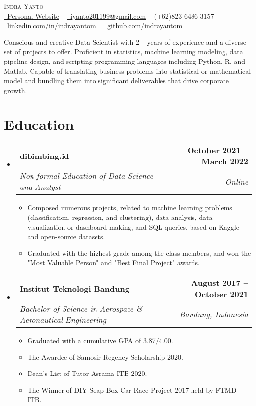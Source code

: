 \documentclass[letterpaper,11pt]{article}
\makeatletter
\newcommand{\resumeItem}[1]{
	\item\small{
		{#1 \vspace{-2pt}}
	}
}
\newcommand{\resumeSubheading}[4]{
	\vspace{-2pt}\item
	\begin{tabular*}{1.0\textwidth}[t]{l@{\extracolsep{\fill}}r}
		\textbf{#1} & \textbf{\small #2} \\
		\textit{\small#3} & \textit{\small #4} \\
	\end{tabular*}\vspace{-7pt}
}
\newcommand{\resumeSubHeadingListStart}{\begin{itemize}[leftmargin=0.0in, label={}]}
\newcommand{\resumeSubHeadingListEnd}{\end{itemize}}
\newcommand{\resumeItemListStart}{\begin{itemize}}
\newcommand{\resumeItemListEnd}{\end{itemize}\vspace{-5pt}}
\makeatother
\begin{document}
	
	
	\begin{center}
		{\Huge \scshape Indra Yanto} %
	\\ \vspace{2pt}
		\small \href{https://indrayantom.github.io/indrapedia/}{\raisebox{-0.2\height}\faGlobe\ Personal Website} ~ \href{mailto:iyanto201199@gmail.com}{\raisebox{-0.2\height}\faEnvelope\  iyanto201199@gmail.com} ~ \raisebox{-0.1\height}\faPhone (+62)823-6486-3157 \\
		\href{https://www.linkedin.com/in/indrayantom/}{\raisebox{-0.2\height}\faLinkedin\ linkedin.com/in/indrayantom}  ~
		\href{https://github.com/indrayantom}{\raisebox{-0.2\height}\faGithub\ github.com/indrayantom}
		\vspace{-8pt}
	\end{center} 
	\vspace{7pt}
	
	Conscious and creative Data Scientist with 2+ years of experience and a diverse set of projects to offer. Proficient in statistics, machine learning modeling, data pipeline design, and scripting programming languages including Python, R, and Matlab. Capable of translating business problems into statistical or mathematical model and bundling them into significant deliverables that drive corporate growth.	
	\section{Education}
	\resumeSubHeadingListStart
	\resumeSubheading
	{dibimbing.id}{October 2021 -- March 2022}
	{Non-formal Education of Data Science and Analyst}{Online}
		\resumeItemListStart
	\resumeItem{Composed numerous projects, related to machine learning problems (classification, regression, and clustering), data analysis, data visualization or dashboard making, and SQL queries, based on Kaggle and open-source datasets.}
	\resumeItem{Graduated with the highest grade among the class members, and won the "Most Valuable Person" and "Best Final Project" awards.}
	\resumeItemListEnd
	\resumeSubheading
	{Institut Teknologi Bandung}{August 2017 -- October 2021}
	{Bachelor of Science in Aerospace \& Aeronautical Engineering}{Bandung, Indonesia}
	\resumeItemListStart
	\resumeItem{Graduated with a cumulative GPA  of 3.87/4.00. }
	\resumeItem{The Awardee of Samosir Regency Scholarship 2020.}
	\resumeItem{Dean's List of Tutor Asrama ITB 2020.}
	\resumeItem{The Winner of DIY Soap-Box Car Race Project 2017 held by FTMD ITB.}
	\resumeItemListEnd
	\resumeSubHeadingListEnd
	
\end{document}
